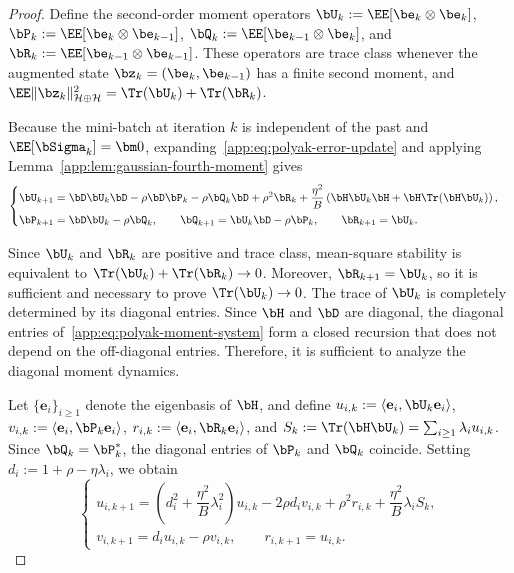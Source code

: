 \begin{proof}
Define the second-order moment operators
\(\bU_k:=\EE[\be_k\otimes\be_k]\),
\(\bP_k:=\EE[\be_k\otimes\be_{k-1}]\),
\(\bQ_k:=\EE[\be_{k-1}\otimes\be_k]\), and
\(\bR_k:=\EE[\be_{k-1}\otimes\be_{k-1}]\).
These operators are trace class whenever the augmented state
\(\bz_k=(\be_k,\be_{k-1})\) has a finite second moment, and
\(\EE\|\bz_k\|_{\mathcal H\oplus\mathcal H}^2
=\Tr(\bU_k)+\Tr(\bR_k)\).

Because the mini-batch at iteration \(k\) is independent of the past and \(\EE[\bSigma_k]=\bm0\), expanding~\eqref{app:eq:polyak-error-update} and applying Lemma~\ref{app:lem:gaussian-fourth-moment} gives
\begin{equation}
\label{app:eq:polyak-moment-system}
\begin{cases}
\bU_{k+1}
=
\bD\bU_k\bD
-\rho\bD\bP_k
-\rho\bQ_k\bD
+\rho^2\bR_k
+\dfrac{\eta^2}{B}
\left(
\bH\bU_k\bH+\bH\Tr(\bH\bU_k)
\right),
\\[2mm]
\bP_{k+1}=\bD\bU_k-\rho\bQ_k,
\qquad
\bQ_{k+1}=\bU_k\bD-\rho\bP_k,
\qquad
\bR_{k+1}=\bU_k.
\end{cases}
\end{equation}

Since \(\bU_k\) and \(\bR_k\) are positive and trace class, mean-square stability is equivalent to
\(\Tr(\bU_k)+\Tr(\bR_k)\to0\). Moreover, \(\bR_{k+1}=\bU_k\), so it is sufficient and necessary to prove \(\Tr(\bU_k)\to0\). The trace of \(\bU_k\) is completely determined by its diagonal entries. Since \(\bH\) and \(\bD\) are diagonal, the diagonal entries of~\eqref{app:eq:polyak-moment-system} form a closed recursion that does not depend on the off-diagonal entries. Therefore, it is sufficient to analyze the diagonal moment dynamics.

Let \(\{\mathbf e_i\}_{i\geq1}\) denote the eigenbasis of \(\bH\), and define
\(u_{i,k}:=\langle\mathbf e_i,\bU_k\mathbf e_i\rangle\),
\(v_{i,k}:=\langle\mathbf e_i,\bP_k\mathbf e_i\rangle\),
\(r_{i,k}:=\langle\mathbf e_i,\bR_k\mathbf e_i\rangle\), and
\(S_k:=\Tr(\bH\bU_k)=\sum_{i\geq1}\lambda_i u_{i,k}\).
Since \(\bQ_k=\bP_k^*\), the diagonal entries of \(\bP_k\) and \(\bQ_k\) coincide. Setting \(d_i:=1+\rho-\eta\lambda_i\), we obtain
\begin{equation}
\label{app:eq:polyak-diagonal-recursion}
\begin{cases}
u_{i,k+1}
=
\left(d_i^2+\dfrac{\eta^2}{B}\lambda_i^2\right)u_{i,k}
-2\rho d_i v_{i,k}
+\rho^2r_{i,k}
+\dfrac{\eta^2}{B}\lambda_iS_k,
\\[2mm]
v_{i,k+1}=d_i u_{i,k}-\rho v_{i,k},
\qquad
r_{i,k+1}=u_{i,k}.
\end{cases}
\end{equation}


\end{proof}
